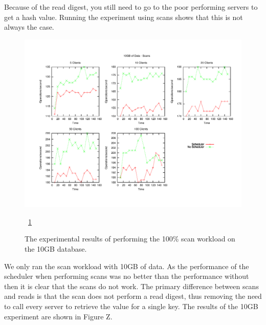 \documentclass[]{acm_proc_article-sp}
\begin{document}
Because of the read digest, you still need to go to the poor performing servers to get a hash value. Running the experiment using scans shows that this is not always the case.


\begin{figure}[t]
\centering
\includegraphics[scale=0.5]{images/10GB_Scans.pdf}
\vspace{-15pt}
\caption{The experimental results of performing the 100\% scan workload on the 10GB database.}
\label{fig:10g_scans}                                   ~\ref{fig:10g_scans}
\end{figure}

We only ran the scan workload with 10GB of data. As the performance of the scheduler when performing scans was no better than the performance without then it is clear that the scans do not work. The primary difference between scans and reads is that the scan does not perform a read digest, thus removing the need to call every server to retrieve the value for a single key.
The results of the 10GB experiment are shown in Figure Z.
\end{document}
